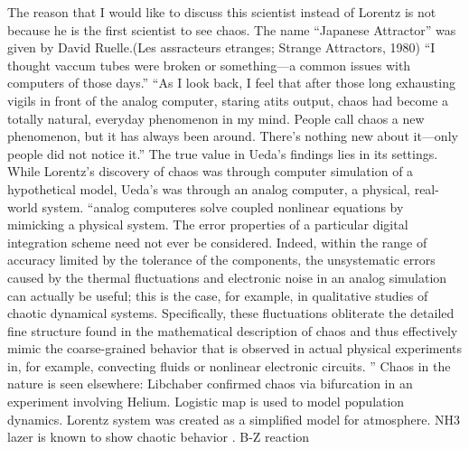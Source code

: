 \documentclass[12pt,twoside]{book}
\begin{document}
The reason that I would like to discuss this scientist instead of Lorentz is not because he is the first scientist to see chaos.
The name ``Japanese Attractor'' was given by David Ruelle.(Les assracteurs etranges; Strange Attractors, 1980)
``I thought vaccum tubes were broken or something---a common issues with computers of those days.'' \citep{lorentzbook} %
``As I look back, I feel that after those long exhausting vigils in front of the analog computer, staring atits output, chaos had become a totally natural, everyday phenomenon in my mind.
People call chaos a new phenomenon, but it has always been around.
There's nothing new about it---only people did not notice it.''\cite[p27]{ueda-abraham}
The true value in Ueda's findings lies in its settings.
While Lorentz's discovery of chaos was through computer simulation of a hypothetical model, Ueda's was through an analog computer, a physical, real-world system.
``analog computeres solve coupled nonlinear equations by mimicking a physical system.
The error properties of a particular digital integration scheme need not ever be considered.
Indeed, within the range of accuracy limited by the tolerance of the components, the unsystematic errors caused by the thermal fluctuations and electronic noise in an analog simulation can actually be useful; this is the case, for example, in qualitative studies of chaotic dynamical systems.
Specifically, these fluctuations obliterate the detailed fine structure found in the mathematical description of chaos and thus effectively mimic the coarse-grained behavior that is observed in actual physical experiments in, for example, convecting fluids or nonlinear electronic circuits.
''\cite[p.383]{campbell}
Chaos in the nature is seen elsewhere:
Libchaber confirmed chaos via bifurcation in an experiment involving Helium.
Logistic map is used to model population dynamics.
Lorentz system was created as a simplified model for atmosphere.
NH3 lazer is known to show chaotic behavior \citep{kantz-schreiber}.
B-Z reaction
\end{document}
